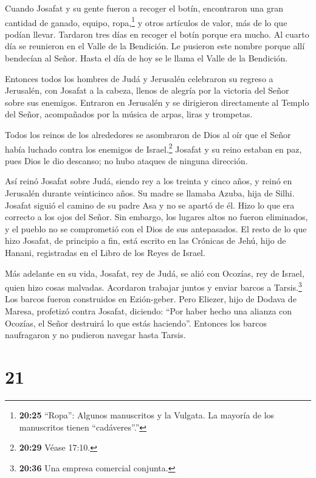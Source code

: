  Cuando Josafat y su gente fueron a recoger el botín,
encontraron una gran cantidad de ganado, equipo, ropa,\footnote{\textbf{20:25}
  ``Ropa'': Algunos manuscritos y la Vulgata. La mayoría de los
  manuscritos tienen ``cadáveres''.''} y otros artículos de valor, más
de lo que podían llevar. Tardaron tres días en recoger el botín porque
era mucho.  Al cuarto día se reunieron en el Valle de la
Bendición. Le pusieron este nombre porque allí bendecían al Señor. Hasta
el día de hoy se le llama el Valle de la Bendición.

 Entonces todos los hombres de Judá y Jerusalén celebraron
su regreso a Jerusalén, con Josafat a la cabeza, llenos de alegría por
la victoria del Señor sobre sus enemigos.  Entraron en
Jerusalén y se dirigieron directamente al Templo del Señor, acompañados
por la música de arpas, liras y trompetas.

 Todos los reinos de los alrededores se asombraron de Dios
al oír que el Señor había luchado contra los enemigos de
Israel.\footnote{\textbf{20:29} Véase 17:10.}  Josafat y su
reino estaban en paz, pues Dios le dio descanso; no hubo ataques de
ninguna dirección.

 Así reinó Josafat sobre Judá, siendo rey a los treinta y
cinco años, y reinó en Jerusalén durante veinticinco años. Su madre se
llamaba Azuba, hija de Silhi.  Josafat siguió el camino de
su padre Asa y no se apartó de él. Hizo lo que era correcto a los ojos
del Señor.  Sin embargo, los lugares altos no fueron
eliminados, y el pueblo no se comprometió con el Dios de sus
antepasados.  El resto de lo que hizo Josafat, de principio
a fin, está escrito en las Crónicas de Jehú, hijo de Hanani, registradas
en el Libro de los Reyes de Israel.

 Más adelante en su vida, Josafat, rey de Judá, se alió con
Ocozías, rey de Israel, quien hizo cosas malvadas. 
Acordaron trabajar juntos y enviar barcos a Tarsis.\footnote{\textbf{20:36}
  Una empresa comercial conjunta.} Los barcos fueron construidos en
Ezión-geber.  Pero Eliezer, hijo de Dodava de Maresa,
profetizó contra Josafat, diciendo: ``Por haber hecho una alianza con
Ocozías, el Señor destruirá lo que estás haciendo''. Entonces los barcos
naufragaron y no pudieron navegar hasta Tarsis.

\hypertarget{section-20}{%
\section{21}\label{section-20}}


